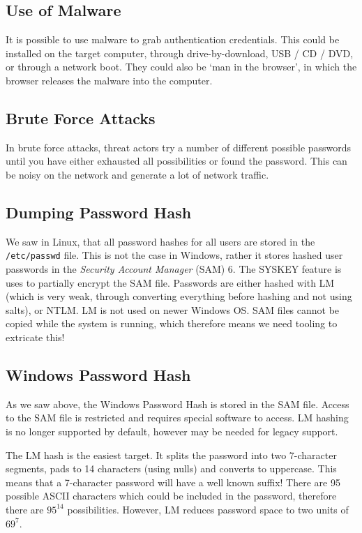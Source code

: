 \subsection{Use of Malware}
It is possible to use malware to grab authentication credentials. This could be installed on the target computer, through drive-by-download, USB / CD / DVD, or through a network boot. They could also be `man in the browser', in which the browser releases the malware into the computer. 

\subsection{Brute Force Attacks}
In brute force attacks, threat actors try a number of different possible passwords until you have either exhausted all possibilities or found the password. This can be noisy on the network and generate a lot of network traffic.

\subsection{Dumping Password Hash}
We saw in Linux, that all password hashes for all users are stored in the \verb|/etc/passwd| file. This is not the case in Windows, rather it stores hashed user passwords in the \textit{Security Account Manager} (SAM) 6. The SYSKEY feature is uses to partially encrypt the SAM file. Passwords are either hashed with LM (which is very weak, through converting everything before hashing and not using salts), or NTLM. LM is not used on newer Windows OS. SAM files cannot be copied while the system is running, which therefore means we need tooling to extricate this!

\subsection{Windows Password Hash}
As we saw above, the Windows Password Hash is stored in the SAM file. Access to the SAM file is restricted and requires special software to access. LM hashing is no longer supported by default, however may be needed for legacy support.


The LM hash is the easiest target. It splits the password into two 7-character segments, pads to 14 characters (using nulls) and converts to uppercase. This means that a 7-character password will have a well known suffix! There are 95 possible ASCII characters which could be included in the password, therefore there are $95^{14}$ possibilities. However, LM reduces password space to two units of $69^7$. \\

